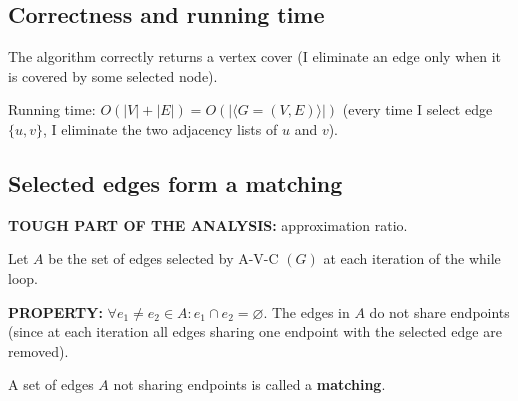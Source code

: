 \subsection{Correctness and running time}
The algorithm correctly returns a vertex cover (I eliminate an edge only when it is covered by some selected node).

Running time: $O(|V|+|E|)=O(|\langle G=(V,E)\rangle|)$ (every time I select edge $\{u,v\}$, I eliminate the two adjacency lists of $u$ and $v$).

\subsection{Selected edges form a matching}
\textbf{TOUGH PART OF THE ANALYSIS:} approximation ratio.

Let $A$ be the set of edges selected by A-V-C $(G)$ at each iteration of the while loop.

\begin{notesresult}
\textbf{PROPERTY:} $\forall e_1\ne e_2\in A:e_1\cap e_2=\varnothing$.
The edges in $A$ do not share endpoints (since at each iteration all edges sharing one endpoint with the selected edge are removed).
\end{notesresult}

\begin{notesdefinition}
A set of edges $A$ not sharing endpoints is called a \textbf{matching}.
\end{notesdefinition}
